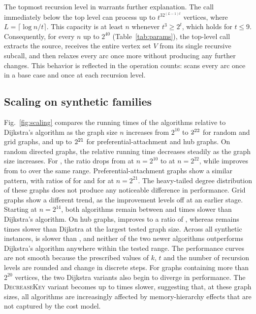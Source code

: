 The topmost recursion level in \bmB{} warrants further explanation. The call immediately below the
top level can process up to $t^32^{(L-1)t}$ vertices, where $L=\lceil\log n/t\rceil$. This capacity
is at least $n$ whenever $t^3\ge 2^t$, which holds for $t\le 9$. Consequently, for every $n$ up to
$2^{40}$ (Table~\ref{tab:params}), the top-level call extracts the source, receives the entire
vertex set $V$ from its single recursive subcall, and then relaxes every arc once more without
producing any further changes. This behavior is reflected in the operation counts: \bmB{} scans
every arc once in a base case and once at each recursion level.

\subsection{Scaling on synthetic families}
Fig.~\ref{fig:scaling} compares the running times of the algorithms relative to Dijkstra's algorithm
as the graph size $n$ increases from $2^{10}$ to $2^{22}$ for random and grid graphs,
and up to $2^{21}$ for preferential-attachment and hub graphs. On random directed
graphs, the relative running time decreases steadily as the graph size increases. For \bmA{}, the
ratio drops from \ScaleRandTwoFiveFirst{} at $n=2^{10}$ to \ScaleRandTwoFiveLast{} at $n=2^{22}$,
while \bmB{} improves from \ScaleRandTwoSixFirst{} to \ScaleRandTwoSixLast{} over the same range.
Preferential-attachment graphs show a similar pattern, with ratios of \ScaleBaTwoFiveLast{} for
\bmA{} and \ScaleBaTwoSixLast{} for \bmB{} at $n=2^{21}$. The heavy-tailed degree distribution of
these graphs does not produce any noticeable difference in performance. Grid graphs show a different
trend, as the improvement levels off at an earlier stage. Starting at $n=2^{14}$, both algorithms
remain between \GridLateMin{} and \GridLateMax{} times slower than Dijkstra's algorithm. On hub
graphs, \bmA{} improves to a ratio of \ScaleHubTwoFiveLast{}, whereas \bmB{} remains
\ScaleHubTwoSixLast{} times slower than Dijkstra at the largest tested graph size. Across all
\SynthPoints{} synthetic instances, \bmB{} is slower than \bmA{}, and neither of the two newer
algorithms outperforms Dijkstra's algorithm anywhere within the tested range. The performance curves
are not smooth because the prescribed values of $k$, $t$ and the number of recursion levels are
rounded and change in discrete steps. For graphs containing more than $2^{20}$ vertices, the two
Dijkstra variants also begin to diverge in performance. The \textsc{DecreaseKey} variant becomes up
to \DkLargeMax{} times slower, suggesting that, at these graph sizes, all algorithms are
increasingly affected by memory-hierarchy effects that are not captured by the cost model.

